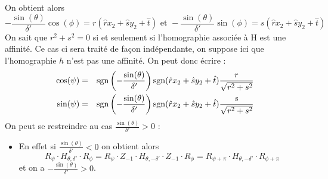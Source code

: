 On obtient alors 
 \begin{equation*}
 -\frac{\sin(\theta)}{\delta'}\cos(\phi)=r(\hat r x_2 + \hat s y_2 +\hat t)\text{ et } -\frac{\sin(\theta)}{\delta'}\sin(\phi)=s(\hat r x_2 + \hat s y_2 +\hat t)
 \end{equation*}
 On sait que $r^{2}+s^{2}=0$ si et seulement si l'homographie associée à H est une affinité. Ce cas ci sera traité de façon indépendante, on suppose ici que l'homographie $h$ n'est pas une affinité. On peut donc écrire :
 \begin{eqnarray*}
 \cos(\psi) &=& \operatorname{sgn}\left(-\frac{\sin(\theta)}{ \delta'}\right)\operatorname{sgn}(\hat r x_2 + \hat s y_2 +\hat t)\frac{r}{\sqrt{r^{2}+s^{2}}}\\
 \sin(\psi) &=& \operatorname{sgn}\left(-\frac{\sin(\theta)}{ \delta'}\right)\operatorname{sgn}(\hat r x_2 + \hat s y_2 +\hat t)\frac{s}{\sqrt{r^{2}+s^{2}}}
 \end{eqnarray*}
 On peut se restreindre au cas $\frac{\sin(\theta)}{\delta'}>0$ :\\
 \begin{itemize}
 \item En effet si $\frac{\sin(\theta)}{\delta'}<0$ on obtient alors
 \begin{equation*}
 R_{\psi} \cdot H_{\theta,\delta'} \cdot R_{\phi}=R_{\psi} \cdot Z_{-1}\cdot H_{\theta,-\delta'}\cdot Z_{-1} \cdot R_{\phi}= R_{\psi+\pi} \cdot H_{\theta,-\delta'}\cdot R_{\phi+\pi}
 \end{equation*}
 et on a $-\frac{\sin(\theta)}{\delta'}>0$.\\
 \end{itemize}


